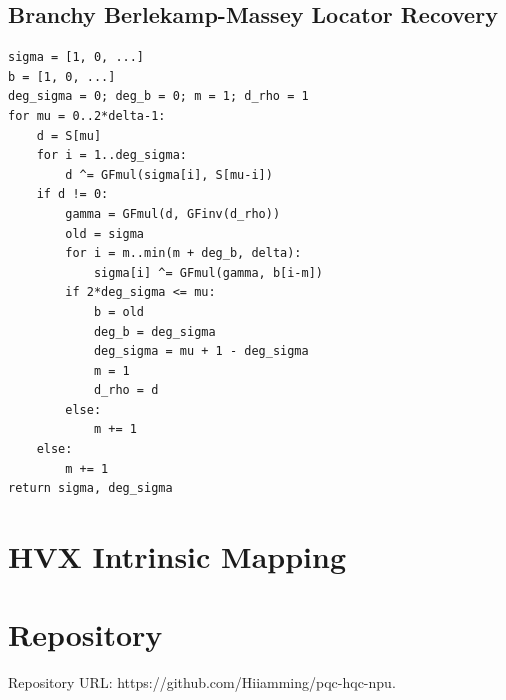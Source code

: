 \documentclass[12pt,a4paper]{report}
\begin{document}
\section{Branchy Berlekamp-Massey Locator Recovery}
\begin{lstlisting}[caption={Scalar locator recovery with table-driven GF products.}]
sigma = [1, 0, ...]
b = [1, 0, ...]
deg_sigma = 0; deg_b = 0; m = 1; d_rho = 1
for mu = 0..2*delta-1:
    d = S[mu]
    for i = 1..deg_sigma:
        d ^= GFmul(sigma[i], S[mu-i])
    if d != 0:
        gamma = GFmul(d, GFinv(d_rho))
        old = sigma
        for i = m..min(m + deg_b, delta):
            sigma[i] ^= GFmul(gamma, b[i-m])
        if 2*deg_sigma <= mu:
            b = old
            deg_b = deg_sigma
            deg_sigma = mu + 1 - deg_sigma
            m = 1
            d_rho = d
        else:
            m += 1
    else:
        m += 1
return sigma, deg_sigma
\end{lstlisting}

\chapter{HVX Intrinsic Mapping}
\label{app:intrinsics}
\begin{table}[h]
\centering
\caption{Representative mapping from vector abstraction to HVX intrinsics.}
\end{table}

\chapter{Repository}
\label{app:repo}
Repository URL: https://github.com/Hiiamming/pqc-hqc-npu.\\
\end{document}
